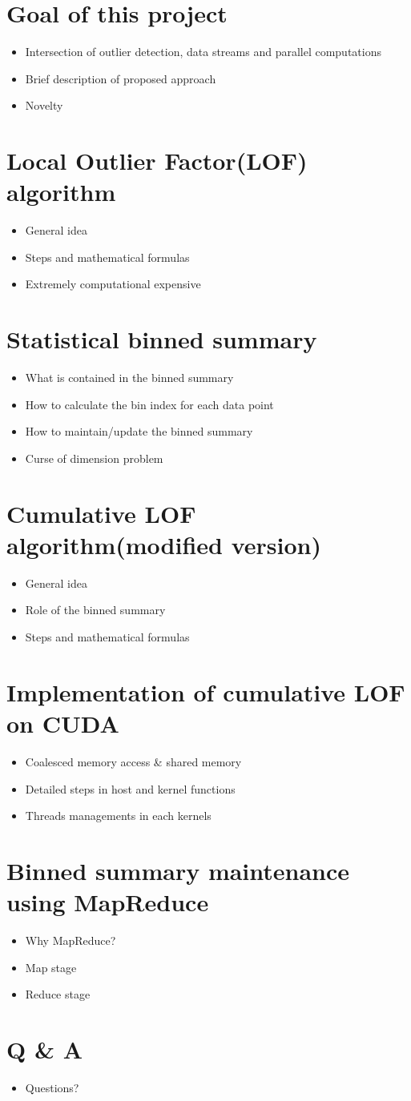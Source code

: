 \documentclass[11pt]{article}       %
\newenvironment{slide}[1]        {\section{#1} \begin{itemize}}%
                                 {\end{itemize}}
\begin{document}
\begin{slide}{Goal of this project}
\item Intersection of outlier detection, data streams and parallel computations
\item Brief description of proposed approach
\item Novelty 
\end{slide}

\begin{slide}{Local Outlier Factor(LOF) algorithm}
\item General idea
\item Steps and mathematical formulas
\item Extremely computational expensive 
\end{slide}

\begin{slide}{Statistical binned summary}
\item What is contained in the binned summary
\item How to calculate the bin index for each data point
\item How to maintain/update the binned summary
\item Curse of dimension problem
\end{slide}

\begin{slide}{Cumulative LOF algorithm(modified version)}
\item General idea
\item Role of the binned summary
\item Steps and mathematical formulas
\end{slide}

\begin{slide}{Implementation of cumulative LOF on CUDA}
\item Coalesced memory access \& shared memory
\item Detailed steps in host and kernel functions
\item Threads managements in each kernels
\end{slide}

\begin{slide}{Binned summary maintenance using MapReduce}
\item Why MapReduce?
\item Map stage
\item Reduce stage
\end{slide}

\begin{slide}{Q \& A}
\item Questions?
\end{slide}



\end{document}
